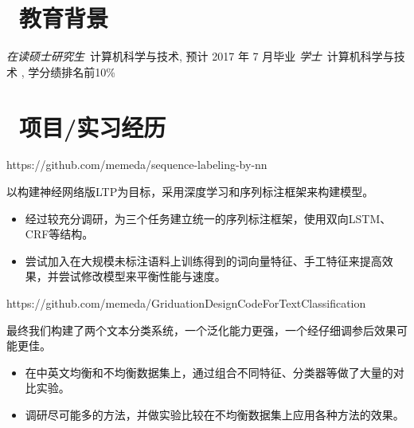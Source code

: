 \documentclass{resume}
\begin{document}



\section{\faGraduationCap\  教育背景}
\textit{在读硕士研究生}\ 计算机科学与技术, 预计 2017 年 7 月毕业
\textit{学士}\ 计算机科学与技术 , 学分绩排名前10\%

\section{\faUsers\ 项目/实习经历}

\begin{onehalfspacing}
https://github.com/memeda/sequence-labeling-by-nn

以构建神经网络版LTP为目标，采用深度学习和序列标注框架来构建模型。
\begin{itemize}
  \item 经过较充分调研，为三个任务建立统一的序列标注框架，使用双向LSTM、CRF等结构。
  \item 尝试加入在大规模未标注语料上训练得到的词向量特征、手工特征来提高效果，并尝试修改模型来平衡性能与速度。
\end{itemize}
\end{onehalfspacing}

\begin{onehalfspacing}
https://github.com/memeda/GriduationDesignCodeForTextClassification

最终我们构建了两个文本分类系统，一个泛化能力更强，一个经仔细调参后效果可能更佳。
\begin{itemize}
  \item 在中英文均衡和不均衡数据集上，通过组合不同特征、分类器等做了大量的对比实验。
  \item 调研尽可能多的方法，并做实验比较在不均衡数据集上应用各种方法的效果。
\end{itemize}
\end{onehalfspacing}
\end{document}

